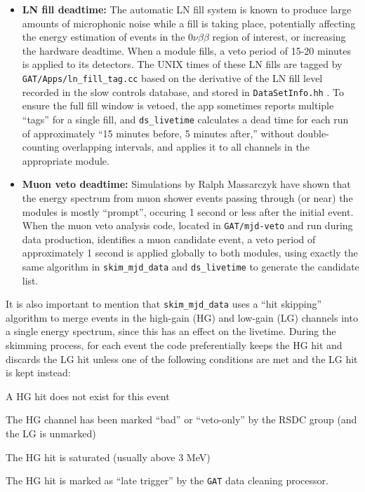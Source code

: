 \documentclass[notitlepage,rmp,aps,10pt]{revtex4-1}
\newenvironment{itemize_nospace}
{ \begin{itemize}
    \setlength{\itemsep}{3pt}
    \setlength{\parskip}{0pt}
    \setlength{\parsep}{0pt}     }
{ \end{itemize}                  }
\newcommand{\tty}{\texttt}
\begin{document}
\begin{itemize}
    \item \textbf{LN fill deadtime:} The automatic LN fill system is known to produce large amounts of microphonic noise while a fill is taking place, potentially affecting the energy estimation of events in the $0\nu\beta\beta$ region of interest, or increasing the hardware deadtime.  When a module fills, a veto period of 15-20 minutes is applied to its detectors.  The UNIX times of these LN fills are tagged by \tty{GAT/Apps/ln\_fill\_tag.cc} based on the derivative of the LN fill level recorded in the slow controls database, and stored in \tty{DataSetInfo.hh} \cite{Wiseman2016}. To ensure the full fill window is vetoed, the app sometimes reports multiple ``tags'' for a single fill, and \tty{ds\_livetime} calculates a dead time for each run of approximately ``15 minutes before, 5 minutes after,'' without double-counting overlapping intervals, and applies it to all channels in the appropriate module.

    \item \textbf{Muon veto deadtime:} Simulations by Ralph Massarczyk \cite{ralph} have shown that the energy spectrum from muon shower events passing through (or near) the modules is mostly ``prompt'', occuring 1 second or less after the initial event.  When the muon veto analysis code, located in \tty{GAT/mjd-veto} \cite{Wiseman2015} and run during data production, identifies a muon candidate event, a veto period of approximately 1 second is applied globally to both modules, using exactly the same algorithm in \tty{skim\_mjd\_data} and \tty{ds\_livetime} to generate the candidate list.

\end{itemize}

It is also important to mention that \tty{skim\_mjd\_data} uses a ``hit skipping'' algorithm to merge events in the high-gain (HG) and low-gain (LG) channels into a single energy spectrum, since this has an effect on the livetime.  During the skimming process, for each event the code preferentially keeps the HG hit and discards the LG hit unless one of the following conditions are met and the LG hit is kept instead:
\begin{itemize_nospace}
  \item A HG hit does not exist for this event
  \item The HG channel has been marked ``bad'' or ``veto-only'' by the RSDC group (and the LG is unmarked)
  \item The HG hit is saturated (usually above 3 MeV)
  \item The HG hit is marked as ``late trigger'' by the \tty{GAT} data cleaning processor.
\end{itemize_nospace}
\end{document}
